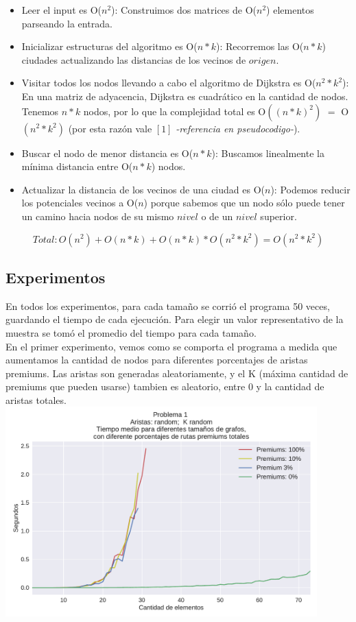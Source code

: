\begin{itemize}
	\item Leer el input es O($n^2$): Construimos dos matrices de O($n^2$) elementos parseando la entrada.
	\item Inicializar estructuras del algoritmo es O($n*k$): Recorremos las O($n*k$) ciudades actualizando las distancias de los vecinos de $origen$.
	\item Visitar todos los nodos llevando a cabo el algoritmo de Dijkstra es O($n^2*k^2$): En una matriz de adyacencia, Dijkstra es cuadrático en la cantidad de nodos. Tenemos $n*k$ nodos, por lo que la complejidad total es O$((n*k)^2)$ $=$ O$(n^2*k^2)$ (por esta razón vale  \label{whilejust}\hyperref[whileback]{$[1]$} \textit{-referencia en pseudocodigo-}).
	\item Buscar el nodo de menor distancia es O($n*k$):  Buscamos linealmente la mínima distancia entre O($n*k$) nodos.
	\item Actualizar la distancia de los vecinos de una ciudad es O($n$): Podemos reducir los potenciales vecinos a O($n$) porque sabemos que un nodo sólo puede tener un camino hacia nodos de su mismo $nivel$ o de un $nivel$ superior.
\end{itemize}

$$Total:  O(n^2) + O(n*k) + O(n*k) * O(n^2*k^2) = O(n^2*k^2) $$

\subsection{Experimentos}

En todos los experimentos, para cada tamaño se corrió el programa 50 veces, guardando el tiempo de cada ejecución. Para elegir un valor representativo de la muestra se tomó el promedio del tiempo para cada tamaño. \\

En el primer experimento, vemos como se comporta el programa a medida que aumentamos la cantidad de nodos para diferentes porcentajes de aristas premiums. Las aristas son generadas aleatoriamente, y el K (máxima cantidad de premiums que pueden usarse) tambien es aleatorio, entre 0 y la cantidad de aristas totales. \\

{\centering
  \includegraphics[width=0.9\textwidth]{imagenes/problema1/todo_random_bis.pdf} \\
}

